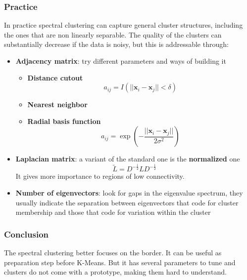 \subsubsection{Practice}
In practice spectral clustering can capture general cluster structures, including the ones that are non linearly separable. The quality of the clusters can substantially decrease if the data is noisy, but this is addressable through:
\begin{itemize}
	\item \textbf{Adjacency matrix}: try different parameters and ways of building it
	\begin{itemize}
		\item \textbf{Distance cutout}
		\begin{equation*}
			a_{ij}=I(\lvert\lvert \mathbf{x}_i - \mathbf{x}_j\rvert\rvert < \delta)
		\end{equation*}
		\item \textbf{Nearest neighbor}
		\item \textbf{Radial basis function}
		\begin{equation*}
			a_{ij} = \exp(- \frac{\lvert\lvert \mathbf{x}_i -\mathbf{x}_j \rvert\rvert}{2 \sigma^2} )
		\end{equation*}
	\end{itemize}
	\item \textbf{Laplacian matrix}: a variant of the standard one is the \textbf{normalized} one
	\begin{equation*}
		\tilde{L} = D^{-\frac{1}{2}}LD^{-\frac{1}{2}}
	\end{equation*}
	It gives more importance to regions of low connectivity.
	\item \textbf{Number of eigenvectors}: look for gaps in the eigenvalue spectrum, they usually indicate the separation between eigenvectors that code for cluster membership and those that code for variation within the cluster
\end{itemize}

\subsubsection{Conclusion}
The spectral clustering better focuses on the border. It can be useful as preparation step before K-Means. But it has several parameters to tune and clusters do not come with a prototype, making them hard to understand.